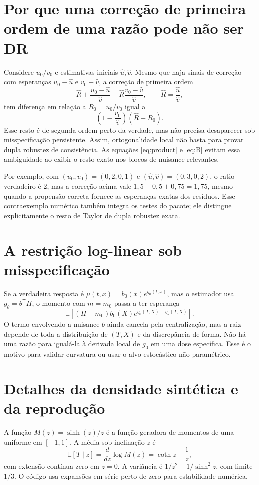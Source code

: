 \documentclass[11pt,a4paper]{article}
\newcommand{\E}{\mathbb E}
\begin{document}
\appendix
\section{Por que uma correção de primeira ordem de uma razão pode não ser DR}
\label{app:ratio}
Considere $u_0/v_0$ e estimativas iniciais $\hat u,\hat v$. Mesmo que haja sinais de correção com esperanças $u_0-\hat u$ e $v_0-\hat v$, a correção de primeira ordem
\[
\widehat R+\frac{u_0-\hat u}{\hat v}
-\widehat R\frac{v_0-\hat v}{\hat v},\qquad
\widehat R=\frac{\hat u}{\hat v},
\]
tem diferença em relação a $R_0=u_0/v_0$ igual a
\[
\left(1-\frac{v_0}{\hat v}\right)(\widehat R-R_0).
\]
Esse resto é de segunda ordem perto da verdade, mas não precisa desaparecer sob misspecificação persistente. Assim, ortogonalidade local não basta para provar dupla robustez de consistência. As equações \eqref{eq:product} e \eqref{eq:B} evitam essa ambiguidade ao exibir o resto exato nos blocos de nuisance relevantes.

Por exemplo, com $(u_0,v_0)=(0{,}2,0{,}1)$ e $(\hat u,\hat v)=(0{,}3,0{,}2)$, o ratio verdadeiro é 2, mas a correção acima vale $1{,}5-0{,}5+0{,}75=1{,}75$, mesmo quando a propensão correta fornece as esperanças exatas dos resíduos. Esse contraexemplo numérico também integra os testes do pacote; ele distingue explicitamente o resto de Taylor de dupla robustez exata.

\section{A restrição log-linear sob misspecificação}
\label{app:misspec}
Se a verdadeira resposta é $\mu(t,x)=b_0(x)e^{g_0(t,x)}$, mas o estimador usa $g_\theta=\theta^{\mathsf T}H$, o momento com $m=m_0$ passa a ter esperança
\[
\E\left[(H-m_0)b_0(X)e^{g_0(T,X)-g_\theta(T,X)}\right].
\]
O termo envolvendo a nuisance $b$ ainda cancela pela centralização, mas a raiz depende de toda a distribuição de $(T,X)$ e da discrepância de forma. Não há uma razão para igualá-la à derivada local de $g_0$ em uma dose específica. Esse é o motivo para validar curvatura ou usar o alvo estocástico não paramétrico.

\section{Detalhes da densidade sintética e da reprodução}
A função $M(z)=\sinh(z)/z$ é a função geradora de momentos de uma uniforme em $[-1,1]$. A média sob inclinação $z$ é
\[
\E[T\mid z]=\frac{d}{dz}\log M(z)=\coth z-\frac1z,
\]
com extensão contínua zero em $z=0$. A variância é $1/z^2-1/\sinh^2z$, com limite $1/3$. O código usa expansões em série perto de zero para estabilidade numérica.
\end{document}
